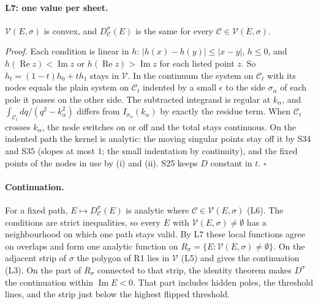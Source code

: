 \documentclass[11pt]{article}
\begin{document}
\paragraph{L7: one value per sheet.} $\mathcal V(E,\sigma)$ is convex, and $D^\sigma_{\mathcal C}(E)$ is the same for every $\mathcal C\in\mathcal V(E,\sigma)$.

\emph{Proof.} Each condition is linear in $h$: $|h(x)-h(y)|\le|x-y|$, $h\le0$, and $h(\operatorname{Re}z)<\operatorname{Im}z$ or $h(\operatorname{Re}z)>\operatorname{Im}z$ for each listed point $z$. So $h_t=(1-t)h_0+th_1$ stays in $\mathcal V$. In the continuum the system on $\mathcal C_t$ with its nodes equals the plain system on $\mathcal C_t$ indented by a small $\epsilon$ to the side $\sigma_\alpha$ of each pole it passes on the other side. The subtracted integrand is regular at $k_\alpha$, and $\int_{\mathcal C_t}dq/(q^2-k_\alpha^2)$ differs from $I_{\sigma_\alpha}(k_\alpha)$ by exactly the residue term. When $\mathcal C_t$ crosses $k_\alpha$, the node switches on or off and the total stays continuous. On the indented path the kernel is analytic: the moving singular points stay off it by S34 and S35 (slopes at most $1$; the small indentation by continuity), and the fixed points of the nodes in use by (i) and (ii). S25 keeps $D$ constant in $t$. $\square$

\paragraph{Continuation.} For a fixed path, $E\mapsto D^\sigma_{\mathcal C}(E)$ is analytic where $\mathcal C\in\mathcal V(E,\sigma)$ (L6). The conditions are strict inequalities, so every $E$ with $\mathcal V(E,\sigma)\ne\emptyset$ has a neighbourhood on which one path stays valid. By L7 these local functions agree on overlaps and form one analytic function on $R_\sigma=\{E:\mathcal V(E,\sigma)\ne\emptyset\}$. On the adjacent strip of $\sigma$ the polygon of R1 lies in $\mathcal V$ (L5) and gives the continuation (L3). On the part of $R_\sigma$ connected to that strip, the identity theorem makes $D^\sigma$ the continuation within $\operatorname{Im}E<0$. That part includes hidden poles, the threshold lines, and the strip just below the highest flipped threshold.
\end{document}
